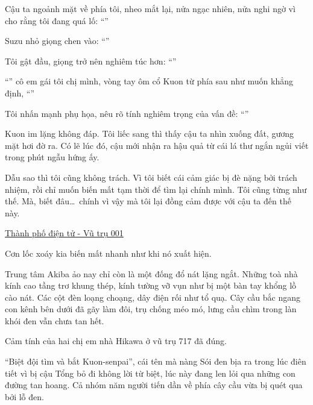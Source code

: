 \documentclass[../main.tex]{subfiles}
\begin{document}
Cậu ta ngoảnh mặt về phía tôi, nheo mắt lại, nửa ngạc nhiên, nửa nghi ngờ vì cho rằng tôi đang quá lố: ``''

Suzu nhỏ giọng chen vào: ``''

Tôi gật đầu, giọng trở nên nghiêm túc hơn: ``''

``'' cô em gái tôi chị mình, vòng tay ôm cổ Kuon từ phía sau như muốn khẳng định, ``''

Tôi nhấn mạnh phụ họa, nêu rõ tính nghiêm trọng của vấn đề: ``''

Kuon im lặng không đáp. Tôi liếc sang thì thấy cậu ta nhìn xuống đất, gương mặt hơi đờ ra. Có lẽ lúc đó, cậu mới nhận ra hậu quả từ cái lá thư ngắn ngủi viết trong phút ngẫu hứng ấy.

Dẫu sao thì tôi cũng không trách. Vì tôi biết cái cảm giác bị đè nặng bởi trách nhiệm, rồi chỉ muốn biến mất tạm thời để tìm lại chính mình. Tôi cũng từng như thế. Mà, biết đâu\dots\ chính vì vậy mà tôi lại đồng cảm được với cậu ta đến thế này.

\begin{center}
    \uline{Thành phố điện tử - Vũ trụ 001}
    \pov{-}
\end{center}

Cơn lốc xoáy kia biến mất nhanh như khi nó xuất hiện.

Trung tâm Akiba ảo nay chỉ còn là một đống đổ nát lặng ngắt. Những toà nhà kính cao tầng trơ khung thép, kính tường vỡ vụn như bị một bàn tay khổng lồ cào nát. Các cột đèn loạng choạng, dây điện rối như tổ quạ. Cây cầu bắc ngang con kênh bên dưới đã gãy làm đôi, trụ chống méo mó, lưng cầu chìm trong làn khói đen vẫn chưa tan hết.

Cảm tính của hai chị em nhà Hikawa ở vũ trụ 717 đã đúng.

``Biệt đội tìm và bắt Kuon-senpai'', cái tên mà nàng Sói đen bịa ra trong lúc điên tiết vì bị cậu Tổng bỏ đi không lời từ biệt, lúc này đang len lỏi qua những con đường tan hoang. Cả nhóm năm người tiến dần về phía cây cầu vừa bị quét qua bởi lỗ đen.
\end{document}
